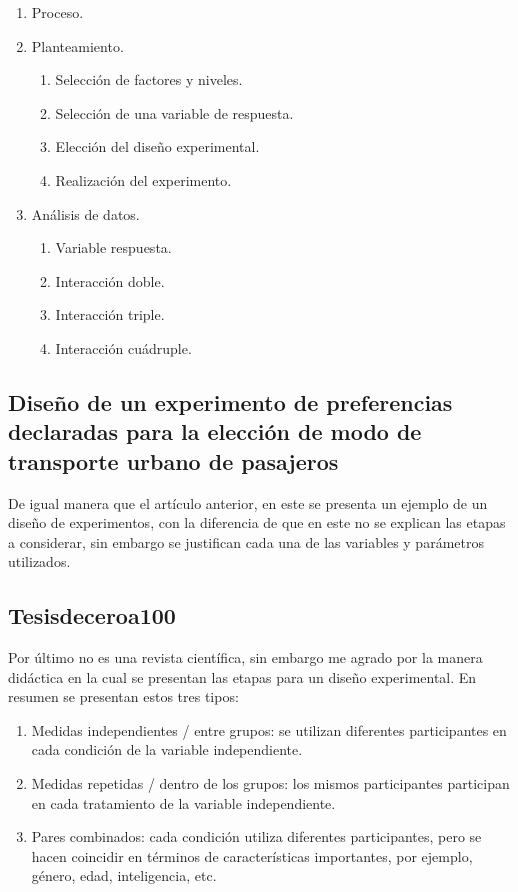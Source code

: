 \documentclass{article}
\begin{document}
\begin{enumerate}
  \item Proceso.
  \item Planteamiento.
  \begin{enumerate}[.1]
    \item Selección de factores y niveles.
    \item Selección de una variable de respuesta.
    \item Elección del diseño experimental.
    \item Realización del experimento.
  \end{enumerate}
  \item Análisis de datos.
  \begin{enumerate}
    \item Variable respuesta.
    \item Interacción doble.
    \item Interacción triple.
    \item Interacción cuádruple.
  \end{enumerate}
\end{enumerate}

\subsection*{Diseño de un experimento de preferencias declaradas para la
elección de modo de transporte urbano de pasajeros}

De igual manera que el artículo anterior, en este se presenta un ejemplo de un diseño de experimentos, con la diferencia de que en este no se explican las etapas a considerar, sin embargo se justifican cada una de las variables y parámetros utilizados.

\subsection*{Tesisdeceroa100}
Por último no es una revista científica, sin embargo me agrado por la manera didáctica en la cual se presentan las etapas para un diseño experimental.
En resumen se presentan estos tres tipos:
\begin{enumerate}
  \item Medidas independientes / entre grupos: se utilizan diferentes participantes en cada condición de la variable independiente.
  \item Medidas repetidas / dentro de los grupos: los mismos participantes participan en cada tratamiento de la variable independiente.
  \item Pares combinados: cada condición utiliza diferentes participantes, pero se hacen coincidir en términos de características importantes, por ejemplo, género, edad, inteligencia, etc.
\end{enumerate}
\end{document}
